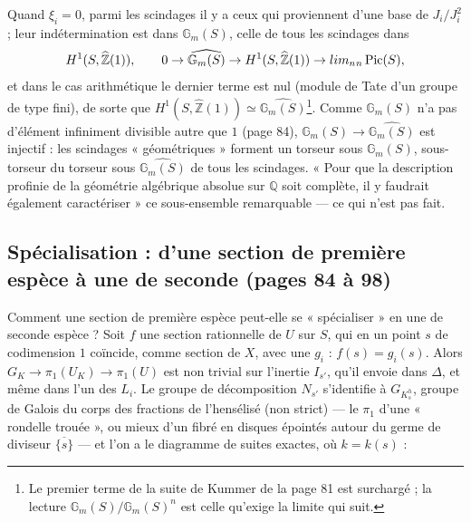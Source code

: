 \documentclass[11pt,a4paper]{article}
\begin{document}
Quand $\xi_i = 0$, parmi les scindages il y a ceux qui proviennent d'une base
de $J_i/J_i^2$ ; leur indétermination est dans $\mathbb{G}_m(S)$, celle de tous
les scindages dans
\[
H^1(S, \widehat{\mathbb{Z}}(1)), \qquad 0 \to \widehat{\mathbb{G}_m(S)} \to H^1(S,
\widehat{\mathbb{Z}}(1)) \to \varprojlim_n {}_n\operatorname{Pic}(S),
\]
et dans le cas arithmétique le dernier terme est nul (module de Tate d'un
groupe de type fini), de sorte que $H^1(S, \widehat{\mathbb{Z}}(1)) \simeq
\widehat{\mathbb{G}_m(S)}$\footnote{Le premier terme de la suite de Kummer de la
page 81 est surchargé ; la lecture $\mathbb{G}_m(S)/\mathbb{G}_m(S)^n$ est celle
qu'exige la limite qui suit.}. Comme $\mathbb{G}_m(S)$ n'a pas d'élément
infiniment divisible autre que $1$ (page 84), $\mathbb{G}_m(S) \to
\widehat{\mathbb{G}_m(S)}$ est injectif : les scindages « géométriques »
forment un torseur sous $\mathbb{G}_m(S)$, sous-torseur du torseur sous
$\widehat{\mathbb{G}_m(S)}$ de tous les scindages. « Pour que la description
profinie de la géométrie algébrique absolue sur $\mathbb{Q}$ soit complète, il
y faudrait également caractériser » ce sous-ensemble remarquable — ce qui
n'est pas fait.

\subsection*{Spécialisation : d'une section de première espèce à une de seconde (pages 84 à 98)}

Comment une section de première espèce peut-elle se « spécialiser » en une de
seconde espèce ? Soit $f$ une section rationnelle de $U$ sur $S$, qui en un
point $s$ de codimension $1$ coïncide, comme section de $X$, avec une $g_i$ :
$f(s) = g_i(s)$. Alors $G_K \to \pi_1(U_K) \to \pi_1(U)$ est non trivial sur
l'inertie $I_{s'}$, qu'il envoie dans $\Delta$, et même dans l'un des $L_i$. Le
groupe de décomposition $N_{s'}$ s'identifie à $G_{K^h_s}$, groupe de Galois du
corps des fractions de l'hensélisé (non strict) — le $\pi_1$ d'une « rondelle
trouée », ou mieux d'un fibré en disques épointés autour du germe de diviseur
$\overline{\{s\}}$ — et l'on a le diagramme de suites exactes, où $k = k(s)$ :

\end{document}
